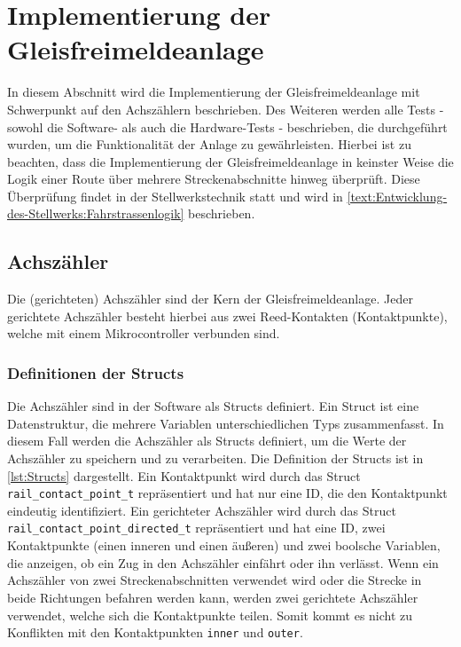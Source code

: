 \section{Implementierung der Gleisfreimeldeanlage}\label{text:Entwicklung-der-GFA:Implementierung-der-Gleisfreimeldeanlage}

In diesem Abschnitt wird die Implementierung der Gleisfreimeldeanlage mit Schwerpunkt auf den Achszählern beschrieben. Des Weiteren werden alle Tests - sowohl die Software- als auch die Hardware-Tests - beschrieben, die durchgeführt wurden, um die Funktionalität der Anlage zu gewährleisten. Hierbei ist zu beachten, dass die Implementierung der Gleisfreimeldeanlage in keinster Weise die Logik einer Route über mehrere Streckenabschnitte hinweg überprüft. Diese Überprüfung findet in der Stellwerkstechnik statt und wird in \autoref{text:Entwicklung-des-Stellwerks:Fahrstrassenlogik}  beschrieben.

\subsection{Achszähler}\label{text:Entwicklung-der-GFA:Implementierung-der-Gleisfreimeldeanlage:Achszähler}

Die (gerichteten) Achszähler sind der Kern der Gleisfreimeldeanlage. Jeder gerichtete Achszähler besteht hierbei aus zwei Reed-Kontakten (Kontaktpunkte), welche mit einem Mikrocontroller verbunden sind. 

\subsubsection{Definitionen der Structs}\label{text:Entwicklung-der-GFA:Implementierung-der-Gleisfreimeldeanlage:Achszähler:Definitionen-der-Structs}

Die Achszähler sind in der Software als Structs definiert. Ein Struct ist eine Datenstruktur, die mehrere Variablen unterschiedlichen Typs zusammenfasst. In diesem Fall werden die Achszähler als Structs definiert, um die Werte der Achszähler zu speichern und zu verarbeiten. Die Definition der Structs ist in \autoref{lst:Structs} dargestellt. Ein Kontaktpunkt wird durch das Struct \texttt{rail\_contact\_point\_t} repräsentiert und hat nur eine ID, die den Kontaktpunkt eindeutig identifiziert. Ein gerichteter Achszähler wird durch das Struct \texttt{rail\_contact\_point\_directed\_t} repräsentiert und hat eine ID, zwei Kontaktpunkte (einen inneren und einen äußeren) und zwei boolsche Variablen, die anzeigen, ob ein Zug in den Achszähler einfährt oder ihn verlässt. 
\newline
Wenn ein Achszähler von zwei Streckenabschnitten verwendet wird oder die Strecke in beide Richtungen befahren werden kann, werden zwei gerichtete Achszähler verwendet, welche sich die Kontaktpunkte teilen. Somit kommt es nicht zu Konflikten mit den Kontaktpunkten \texttt{inner} und \texttt{outer}.


